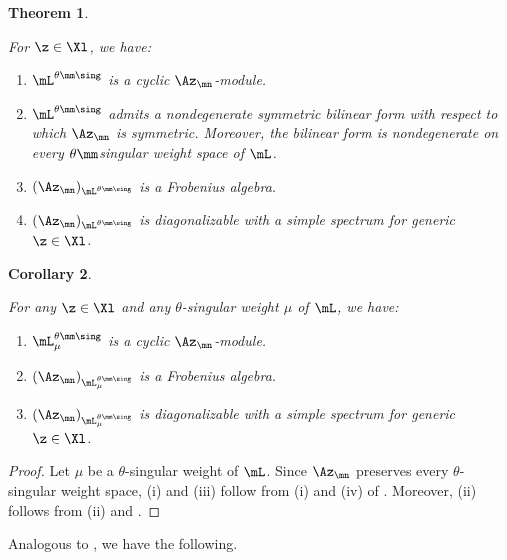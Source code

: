 \documentclass[11pt, reqno]{amsart}
\newtheorem{thm}{Theorem}[section]
\newtheorem{cor}[thm]{Corollary}
\theoremstyle{definition}
\theoremstyle{remark}
\numberwithin{equation}{section}
\begin{document}
\begin{thm}\label{ChL25}

For $\z \in \Xl$, we have:

\begin{enumerate}[\normalfont(i)]
\item $\mL^{\theta\mm\sing}$ is a cyclic $\Az_\mn$-module.

 \item $\mL^{\theta\mm\sing}$ admits a nondegenerate symmetric bilinear form  with respect to which $\Az_\mn$ is symmetric. Moreover, the bilinear form is nondegenerate on every $\theta\mm$singular weight space of $\mL$.

\item $(\Az_\mn)_{\mL^{\theta\mm\sing}}$ is a Frobenius algebra.

\item $(\Az_\mn)_{\mL^{\theta\mm\sing}}$ is diagonalizable with a simple spectrum for generic $\z \in \Xl$.

\end{enumerate}

\end{thm}


\begin{cor} \label{ChL25-poly-weight}

For any $\z \in \Xl$ and any $\theta$-singular weight $\mu$ of $\mL$, we have:

\begin{enumerate}[\normalfont(i)]
\item $\mL_\mu^{\theta\mm\sing}$ is a cyclic $\Az_\mn$-module.

\item $(\Az_\mn)_{\mL_\mu^{\theta\mm\sing}}$ is a Frobenius algebra.

\item $(\Az_\mn)_{\mL_\mu^{\theta\mm\sing}}$ is diagonalizable with a simple spectrum for generic $\z \in \Xl$.

\end{enumerate}

\end{cor}

\begin{proof}
  Let $\mu$ be a $\theta$-singular weight of $\mL$.
	Since $\Az_\mn$ preserves every $\theta$-singular weight space, (i) and (iii) follow from (i) and (iv) of .
  Moreover, (ii) follows from (ii) and .
\end{proof}


Analogous to , we have the following.
\end{document}
